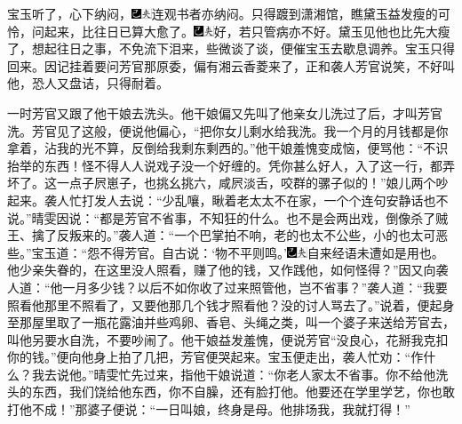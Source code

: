 宝玉听了，心下纳闷，{\includegraphics[width=3mm]{../Images/00003}\includegraphics[width=3mm]{../Images/00012}\footnotesize \kaishu 连观书者亦纳闷。}只得踱到潇湘馆，瞧黛玉益发瘦的可怜，问起来，比往日已算大愈了。{\includegraphics[width=3mm]{../Images/00003}\includegraphics[width=3mm]{../Images/00012}\footnotesize \kaishu 好，若只管病亦不好。}黛玉见他也比先大瘦了，想起往日之事，不免流下泪来，些微谈了谈，便催宝玉去歇息调养。宝玉只得回来。因记挂着要问芳官那原委，偏有湘云香菱来了，正和袭人芳官说笑，不好叫他，恐人又盘诘，只得耐着。

一时芳官又跟了他干娘去洗头。他干娘偏又先叫了他亲女儿洗过了后，才叫芳官洗。芳官见了这般，便说他偏心，``把你女儿剩水给我洗。我一个月的月钱都是你拿着，沾我的光不算，反倒给我剩东剩西的。''他干娘羞愧变成恼，便骂他：``不识抬举的东西！怪不得人人说戏子没一个好缠的。凭你甚么好人，入了这一行，都弄坏了。这一点子屄崽子，也挑幺挑六，咸屄淡舌，咬群的骡子似的！''娘儿两个吵起来。袭人忙打发人去说：``少乱嚷，瞅着老太太不在家，一个个连句安静话也不说。''晴雯因说：``都是芳官不省事，不知狂的什么。也不是会两出戏，倒像杀了贼王、擒了反叛来的。''袭人道：``一个巴掌拍不响，老的也太不公些，小的也太可恶些。''宝玉道：``怨不得芳官。自古说：`物不平则鸣。'{\includegraphics[width=3mm]{../Images/00003}\includegraphics[width=3mm]{../Images/00012}\footnotesize \kaishu 自来经语未遭如是用也。}他少亲失眷的，在这里没人照看，赚了他的钱，又作践他，如何怪得？''因又向袭人道：``他一月多少钱？以后不如你收了过来照管他，岂不省事？''袭人道：``我要照看他那里不照看了，又要他那几个钱才照看他？没的讨人骂去了。''说着，便起身至那屋里取了一瓶花露油并些鸡卵、香皂、头绳之类，叫一个婆子来送给芳官去，叫他另要水自洗，不要吵闹了。他干娘益发羞愧，便说芳官``没良心，花掰我克扣你的钱。''便向他身上拍了几把，芳官便哭起来。宝玉便走出，袭人忙劝：``作什么？我去说他。''晴雯忙先过来，指他干娘说道：``你老人家太不省事。你不给他洗头的东西，我们饶给他东西，你不自臊，还有脸打他。他要还在学里学艺，你也敢打他不成！''那婆子便说：``一日叫娘，终身是母。他排场我，我就打得！''

